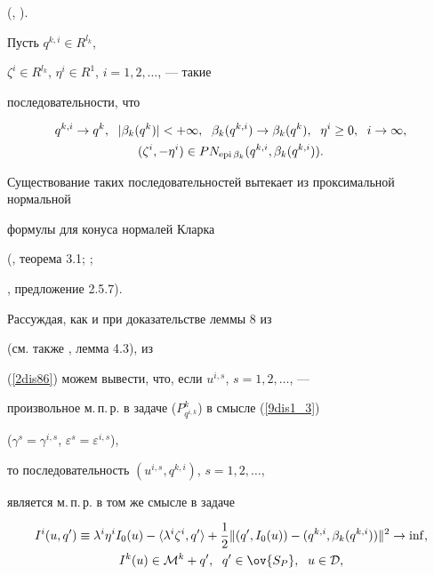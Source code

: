 (\cite{borweinstrojwas}, \cite{bor2}).


\medskip


\addtocounter{defns}{1}





Пусть $q^{k,i}\in R^{l_k}$,


$\zeta^i\in R^{l_k}$, $\eta^i\in R^1$, $i=1,2,\dotsc$, --- такие


последовательности, что


\begin{gather}


\label{2dis86}


q^{k,i}\to q^k,\ \; |\beta_k(q^k)|<+\infty,


\ \; \beta_k(q^{k,i})\to\beta_k(q^k),\ \;


\eta^i\geq 0,\ \; i\to\infty, \\


%


(\zeta^i,-\eta^i)\in


PN_{\epi\beta_k}(q^{k,i},\beta_k(q^{k,i})).\notag


\end{gather}


Существование таких последовательностей вытекает из проксимальной нормальной


формулы для конуса нормалей Кларка


(\cite{borweinstrojwas}, теорема 3.1; \cite{bor2};


\cite{clarke}, предложение 2.5.7).





Рассуждая, как и при доказательстве леммы 8 из \cite{sumin97a}


(см. также \cite{sumin96}, лемма 4.3), из


(\ref{2dis86}) можем вывести, что, если $u^{i,s}$, $s=1,2,\dotsc$, ---


произвольное м.\,п.\,р. в задаче ($P^k_{q^{i,k}}$) в смысле (\ref{9dis1_3})


($\gamma^s=\gamma^{i,s}$, $\varepsilon^s=\varepsilon^{i,s}$),


то последовательность $(u^{i,s},q^{k,i})$, $s=1,2,\dotsc$,


является м.\,п.\,р. в том же смысле в задаче


\begin{gather}


\label{2dis87}


I^i(u,q')\equiv\lambda^i\eta^i


I_0(u)-\langle\lambda^i\zeta^i,q'\rangle+\frac


12\|(q',I_0(u))-(q^{k,i},\beta_k(q^{k,i}))\|^2\to\inf,\\


%


I^k(u)\in{\cal M}^k+q',\ \; q'\in\ov{S_P},\ \;


u\in{\cal D},\notag


\end{gather}


